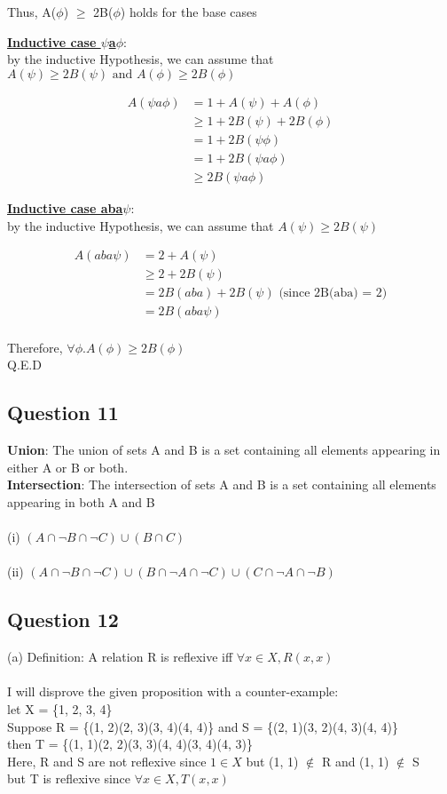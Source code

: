 \documentclass[11pt]{article}
\begin{document}
{{{Thus, A($\phi$) $\geq$ 2B($\phi$) holds for the base cases

\noindent
\underline{\textbf{Inductive case $\psi$a$\phi$}}: \\
by the inductive Hypothesis, we can assume that
$A(\psi) \geq 2B(\psi) \text{ and } A(\phi) \geq 2B(\phi)$

\begin{align*}
    A(\psi a \phi) &= 1 + A(\psi) + A(\phi) \\
    &\geq 1 + 2B(\psi) + 2B(\phi) \\
    &= 1 + 2B(\psi \phi) \\
    &= 1 + 2B(\psi a \phi) \\
    &\geq 2B(\psi a \phi)
\end{align*}

\noindent
\underline{\textbf{Inductive case aba$\psi$}}: \\
by the inductive Hypothesis, we can assume that
$A(\psi) \geq 2B(\psi)$

\begin{align*}
    A(aba \psi) &= 2 + A(\psi) \\
    &\geq 2 + 2B(\psi) \\
    &= 2B(aba) + 2B(\psi) \text{ (since 2B(aba) = 2)} \\
    &= 2B(aba\psi)
\end{align*}
\\
Therefore, $\forall \phi . A(\phi) \geq 2B(\phi)$\\
Q.E.D
\subsection*{Question 11}
\textbf{Union}: The union of sets A and B is a set containing all elements appearing in either A or B or both.\\
\textbf{Intersection}: The intersection of sets A and B is a set containing all elements appearing in both A and B\\
\\
(i) $(A \cap \neg B \cap \neg C) \cup (B \cap C)$ \\ \\
(ii) $(A \cap \neg B \cap \neg C) \cup (B \cap \neg A \cap \neg C) \cup (C \cap \neg A \cap \neg B)$

\subsection*{Question 12}
(a) Definition: A relation R is reflexive iff $\forall x \in X, R(x, x)$ \\ \\
%
I will disprove the given proposition with a counter-example: \\
let X = \{1, 2, 3, 4\} \\
Suppose R = \{(1, 2)(2, 3)(3, 4)(4, 4)\} and S = \{(2, 1)(3, 2)(4, 3)(4, 4)\} \\
then T = \{(1, 1)(2, 2)(3, 3)(4, 4)(3, 4)(4, 3)\} \\
Here, R and S are not reflexive since $1 \in X$ but (1, 1) $\notin$ R and (1, 1) $\notin$ S \\
but T is reflexive since $\forall x \in X, T(x, x)$

}}}
\end{document}
